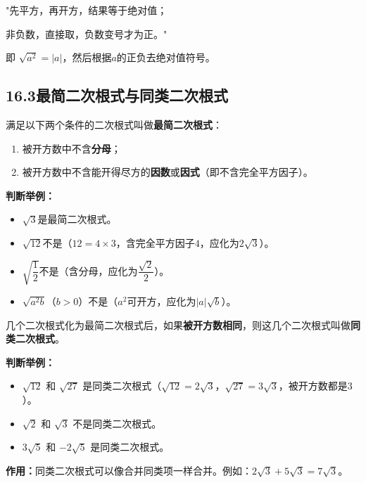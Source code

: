 \documentclass[12pt, a4paper]{ctexart}
\begin{document}
\begin{tipbox}
"先平方，再开方，结果等于绝对值；

非负数，直接取，负数变号才为正。"

即 $\sqrt{a^2} = |a|$，然后根据$a$的正负去绝对值符号。
\end{tipbox}

\subsection*{16.3\quad 最简二次根式与同类二次根式}

\begin{knowledgebox}[最简二次根式]
满足以下两个条件的二次根式叫做\textbf{最简二次根式}：
\begin{enumerate}[leftmargin=2em]
  \item 被开方数中不含\textbf{分母}；
  \item 被开方数中不含能开得尽方的\textbf{因数}或\textbf{因式}（即不含完全平方因子）。
\end{enumerate}

\medskip
\textbf{判断举例：}
\begin{itemize}[leftmargin=2em]
  \item $\sqrt{3}$\quad 是最简二次根式。
  \item $\sqrt{12}$\quad 不是（$12 = 4 \times 3$，含完全平方因子$4$，应化为$2\sqrt{3}$）。
  \item $\sqrt{\dfrac{1}{2}}$\quad 不是（含分母，应化为$\dfrac{\sqrt{2}}{2}$）。
  \item $\sqrt{a^2 b}$（$b > 0$）\quad 不是（$a^2$可开方，应化为$|a|\sqrt{b}$）。
\end{itemize}
\end{knowledgebox}

\begin{knowledgebox}[同类二次根式]
几个二次根式化为最简二次根式后，如果\textbf{被开方数相同}，则这几个二次根式叫做\textbf{同类二次根式}。

\medskip
\textbf{判断举例：}
\begin{itemize}[leftmargin=2em]
  \item $\sqrt{12}$ 和 $\sqrt{27}$ 是同类二次根式（$\sqrt{12}=2\sqrt{3}$，$\sqrt{27}=3\sqrt{3}$，被开方数都是$3$）。
  \item $\sqrt{2}$ 和 $\sqrt{3}$ 不是同类二次根式。
  \item $3\sqrt{5}$ 和 $-2\sqrt{5}$ 是同类二次根式。
\end{itemize}

\medskip
\textbf{作用：}同类二次根式可以像合并同类项一样合并。例如：$2\sqrt{3} + 5\sqrt{3} = 7\sqrt{3}$。
\end{knowledgebox}
\end{document}

